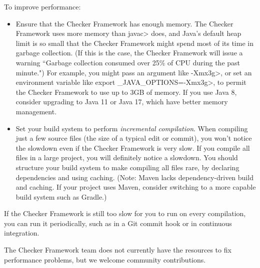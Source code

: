 To improve performance:
\begin{itemize}
\item
  Ensure that the Checker Framework has enough memory.  The Checker
  Framework uses more memory than \<javac> does, and Java's default heap
  limit is so small that the Checker Framework might spend most of its time
  in garbage collection.  (If this is the case, the Checker Framework will
  issue a warning ``Garbage collection consumed over 25\% of CPU during the
  past minute.")  For example, you might pass an argument like
  \<-Xmx3g>, or set an environment variable like \<export
  \_JAVA\_OPTIONS=-Xmx3g>, to permit the Checker Framework to use up to 3GB
  of memory.  If you use Java 8, consider upgrading to Java 11 or Java 17, which have
  better memory management.
\item
  Set your build system to perform \emph{incremental compilation}.  When
  compiling just a few source files (the size of a typical edit or commit),
  you won't notice the slowdown even if the Checker Framework is very slow.
  If you compile all files in a large project, you will definitely notice a
  slowdown.  You should structure your build system to make compiling all
  files rare, by declaring dependencies and using caching.
  (Note: Maven lacks dependency-driven build and caching.  If your project
  uses Maven, consider switching to a more capable build system such as Gradle.)
\end{itemize}

If the Checker Framework is still too slow for you to run on every compilation,
you can run it periodically, such as in a Git commit hook or in continuous
integration.

The Checker Framework team does not currently have the resources to fix
performance problems, but we welcome community contributions.

